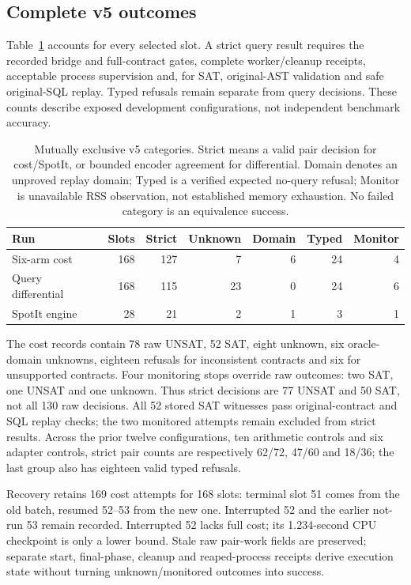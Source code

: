 \subsection{Complete v5 outcomes}
Table~\ref{tab:v5outcomes} accounts for every selected slot. A strict query result requires the recorded bridge and full-contract gates, complete worker/cleanup receipts, acceptable process supervision and, for SAT, original-AST validation and safe original-SQL replay. Typed refusals remain separate from query decisions. These counts describe exposed development configurations, not independent benchmark accuracy.

\begin{table}[htbp]
\centering
\begin{tabular}{lrrrrrr}
\toprule
Run & Slots & Strict & Unknown & Domain & Typed & Monitor\\
\midrule
Six-arm cost & 168 & 127 & 7 & 6 & 24 & 4\\
Query differential & 168 & 115 & 23 & 0 & 24 & 6\\
SpotIt engine & 28 & 21 & 2 & 1 & 3 & 1\\
\bottomrule
\end{tabular}
\caption{Mutually exclusive v5 categories. Strict means a valid pair decision for cost/SpotIt, or bounded encoder agreement for differential. Domain denotes an unproved replay domain; Typed is a verified expected no-query refusal; Monitor is unavailable RSS observation, not established memory exhaustion. No failed category is an equivalence success.}\label{tab:v5outcomes}
\end{table}

The cost records contain 78 raw UNSAT, 52 SAT, eight unknown, six oracle-domain unknowns, eighteen refusals for inconsistent contracts and six for unsupported contracts. Four monitoring stops override raw outcomes: two SAT, one UNSAT and one unknown. Thus strict decisions are 77 UNSAT and 50 SAT, not all 130 raw decisions. All 52 stored SAT witnesses pass original-contract and SQL replay checks; the two monitored attempts remain excluded from strict results. Across the prior twelve configurations, ten arithmetic controls and six adapter controls, strict pair counts are respectively 62/72, 47/60 and 18/36; the last group also has eighteen valid typed refusals.

Recovery retains 169 cost attempts for 168 slots: terminal slot 51 comes from the old batch, resumed 52--53 from the new one. Interrupted 52 and the earlier not-run 53 remain recorded. Interrupted 52 lacks full cost; its 1.234-second CPU checkpoint is only a lower bound. Stale raw pair-work fields are preserved; separate start, final-phase, cleanup and reaped-process receipts derive execution state without turning unknown/monitored outcomes into success.

